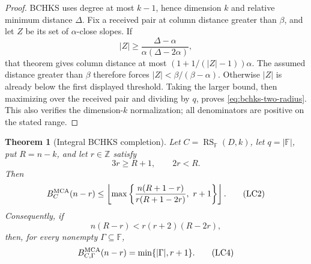 \documentclass[11pt,a4paper]{amsart}
\numberwithin{equation}{section}
\newtheorem{theorem}{Theorem}[section]
\theoremstyle{remark}
\DeclareMathOperator{\RS}{RS}
\newcommand{\F}{\mathbb F}
\newcommand{\Z}{\mathbb Z}
\newcommand{\abs}[1]{\lvert #1\rvert}
\newcommand{\floor}[1]{\left\lfloor #1\right\rfloor}
\begin{document}
\begin{proof}
BCHKS \cite[Thm.~1.3]{BCHKS25} uses degree at most \(k-1\), hence
dimension \(k\) and relative minimum distance \(\Delta\).  Fix a received
pair at column distance greater than \(\beta\), and let \(Z\) be its set of
\(\alpha\)-close slopes.  If
\[
 \abs Z\ge \frac{\Delta-\alpha}{\alpha(\Delta-2\alpha)},
\]
that theorem gives column distance at most
\((1+1/(\abs Z-1))\alpha\).  The assumed distance greater than \(\beta\)
therefore forces \(\abs Z<\beta/(\beta-\alpha)\).  Otherwise \(\abs Z\)
is already below the first displayed threshold.  Taking the larger bound,
then maximizing over the received pair and dividing by \(q\), proves
\eqref{eq:bchks-two-radius}.  This also verifies the dimension-\(k\)
normalization; all denominators are positive on the stated range.
\end{proof}

\begin{theorem}[Integral BCHKS completion]
\label{thm:literature-integral-completion}
Let \(C=\RS_\F(D,k)\), let \(q=\abs\F\), put \(R=n-k\), and let
\(r\in\Z\) satisfy
\[
 3r\ge R+1,\qquad 2r<R.                           \tag{LC1}
 \label{eq:literature-range}
\]
Then
\[
 B_C^{\rm MCA}(n-r)
 \le
 \floor{\max\left\{
       \frac{n(R+1-r)}{r(R+1-2r)},\ r+1
                  \right\}}.                    \tag{LC2}
 \label{eq:literature-integral-upper}
\]
Consequently, if
\[
             n(R-r)<r(r+2)(R-2r),                \tag{LC3}
 \label{eq:literature-integral-condition}
\]
then, for every nonempty \(\Gamma\subseteq\F\),
\[
 B_{C,\Gamma}^{\rm MCA}(n-r)=\min\{\abs\Gamma,r+1\}.
 \tag{LC4}\label{eq:literature-integral-exact}
\]
\end{theorem}
\end{document}
